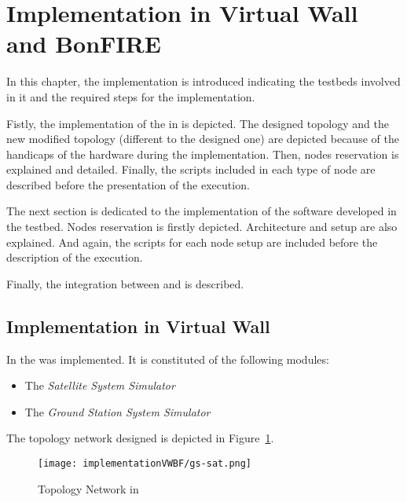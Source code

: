 
\section{Implementation in Virtual Wall and BonFIRE}

In this chapter, the implementation is introduced indicating the testbeds involved in it and the required steps for the implementation.

Fistly, the implementation of the \sss in \vw is depicted. The designed topology and the new
modified topology (different to the designed one) are depicted because of the handicaps of
the hardware during the implementation. Then, nodes reservation is
explained and detailed. Finally, the scripts included in each type of
node are described before the presentation of the execution.

The next section is dedicated to the implementation of the software
developed in the \bonfire testbed. Nodes reservation is firstly
depicted. Architecture and setup are also explained. And again, the
scripts for each node setup are included before the description of the
execution.

Finally, the integration between \vw and \bonfire is described.






\subsection{Implementation in Virtual Wall}

In \vw the \sss was implemented. It is constituted of the
following modules:
\begin{itemize}
\item The \emph{Satellite System Simulator}
\item The \emph{Ground Station System Simulator}
\end{itemize}
The topology network designed is depicted in Figure~\ref{fig:impl-topology-vw}.

\begin{figure}[!h]
\begin{center}
\texttt{[image: implementationVWBF/gs-sat.png]}

\caption{Topology Network in \vw}
\label{fig:impl-topology-vw}
\end{center}
\end{figure}



